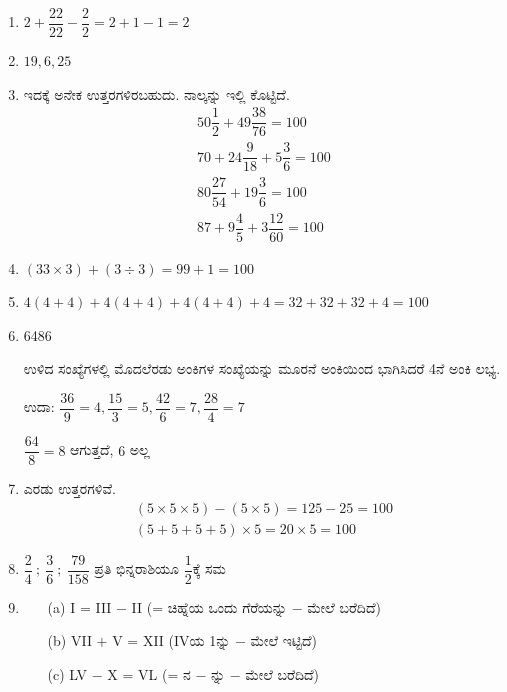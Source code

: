 \begin{enumerate}
\itemsep=5pt

\item $2 + \dfrac{22}{22} - \dfrac{2}{2} = 2 + 1 - 1 = 2$

\item $19, 6, 25$

\item ಇದಕ್ಕೆ ಅನೇಕ ಉತ್ತರಗಳಿರಬಹುದು. ನಾಲ್ಕನ್ನು ಇಲ್ಲಿ ಕೊಟ್ಟಿದೆ. 
\begin{gather*}
50\dfrac{1}{2} + 49\dfrac{38}{76} = 100\\[0.1cm]
70 + 24\dfrac{9}{18} + 5\dfrac{3}{6} = 100\\[0.1cm]
80\dfrac{27}{54} + 19\dfrac{3}{6} = 100\\[0.1cm]
87 + 9\dfrac{4}{5} + 3\dfrac{12}{60} = 100
\end{gather*}

\item $(33\times 3) + (3\div 3) = 99 + 1 = 100$

\item $4 (4+4) + 4(4+4) + 4(4+4) + 4 = 32 + 32 + 32 + 4 = 100$

\item 6486

ಉಳಿದ ಸಂಖ್ಯೆಗಳಲ್ಲಿ ಮೊದಲೆರಡು ಅಂಕಿಗಳ ಸಂಖ್ಯೆಯನ್ನು ಮೂರನೆ ಅಂಕಿಯಿಂದ ಭಾಗಿಸಿದರೆ 4ನೆ ಅಂಕಿ ಲಭ್ಯ.

\vskip 0.1cm

ಉದಾ: $\dfrac{36}{9} = 4, \dfrac{15}{3} = 5, \dfrac{42}{6} = 7, \dfrac{28}{4} = 7$

\vskip 0.1cm

$\dfrac{64}{8} = 8$ ಆಗುತ್ತದೆ, $6$ ಅಲ್ಲ 

\item ಎರಡು ಉತ್ತರಗಳಿವೆ. 
\begin{gather*}
(5\times 5\times 5) - (5\times 5) = 125 - 25 = 100\\
(5+5+5+5)\times 5 = 20\times 5 = 100
\end{gather*}

\vskip 0.1cm

\item $\dfrac{2}{4} ~;~ \dfrac{3}{6} ~;~ \dfrac{79}{158}$ ಪ್ರತಿ ಭಿನ್ನರಾಶಿಯೂ $\dfrac{1}{2}$ಕ್ಕೆ ಸಮ 

\vskip 0.3cm

\item 
\begin{itemize}
\item[(a)] I = III $-$ II (= ಚಿಹ್ನೆಯ ಒಂದು ಗೆರೆಯನ್ನು $-$ ಮೇಲೆ ಬರೆದಿದೆ)
\item[(b)] VII $+$ V = XII (IVಯ 1ನ್ನು $-$ ಮೇಲೆ ಇಟ್ಟಿದೆ)
\item[(c)] LV $-$ X = VL (= ನ $-$ ನ್ನು $-$ ಮೇಲೆ ಬರೆದಿದೆ)
\end{itemize}


\end{enumerate}
